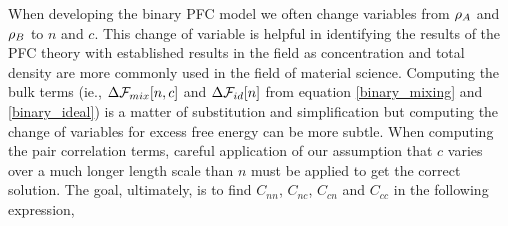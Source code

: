 \label{appendix:binary_corr}

When developing the binary PFC model we often change variables from $\rho_A$ and
$\rho_B$ to $n$ and $c$.  This change of variable is helpful in identifying the
results of the PFC theory with established results in the field as
concentration and total density are more commonly used in the field of material
science. Computing the bulk terms (ie., $\Delta\mathcal{F}_{mix}[n, c]$ and
$\Delta\mathcal{F}_{id}[n]$ from equation \ref{binary_mixing} and \ref{binary_ideal}) is
a matter of substitution and simplification but computing the change of variables for excess free
energy can be more subtle. When computing the pair correlation
terms, careful application of our assumption that $c$ varies over a much longer
length scale than $n$ must be applied to get the correct solution. The goal,
ultimately, is to find $C_{n n}$, $C_{n c}$, $C_{c n}$ and $C_{c c}$ in the
following expression, 

